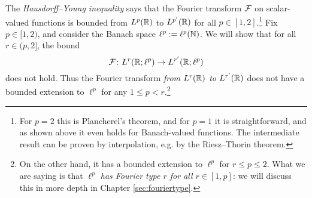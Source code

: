 \begin{example}
  The \emph{Hausdorff--Young inequality} says that the Fourier transform $\mathcal{F}$ on scalar-valued functions is bounded from $L^p(\mathbb{R})$ to $L^{p'}(\mathbb{R})$ for all $p \in [1,2]$.\footnote{For $p=2$ this is Plancherel's theorem, and for $p=1$ it is straightforward, and as shown above it even holds for Banach-valued functions. The intermediate result can be proven by interpolation, e.g. by the Riesz--Thorin theorem.}
  Fix $p \in [1,2)$, and consider the Banach space $\ell^p := \ell^{p}(\mathbb{N})$.
  We will show that for all $r \in (p,2]$, the bound
  \begin{equation}\label{eq:FT-bound-lp}
    \mathcal{F} \colon L^r(\mathbb{R};\ell^p) \rightarrow L^{r'}(\mathbb{R};\ell^p)
  \end{equation}
  does not hold.
  Thus the Fourier transform \emph{from $L^r(\mathbb{R})$ to $L^{r'}(\mathbb{R})$} does not have a bounded extension to $\ell^p$ for any $1 \leq p < r$.\footnote{On the other hand, it has a bounded extension to $\ell^p$ for $r \leq p \leq 2$. What we are saying is that \emph{$\ell^p$ has Fourier type $r$ for all $r \in [1,p]$}: we will discuss this in more depth in Chapter \ref{sec:fouriertype}.}


\end{example}

